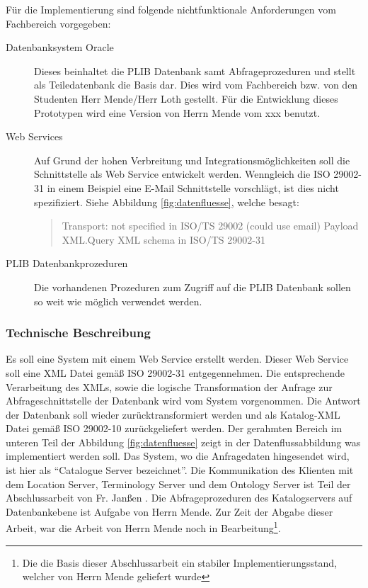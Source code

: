 Für die Implementierung sind folgende nichtfunktionale Anforderungen vom Fachbereich vorgegeben:
\begin{description}
\item[Datenbanksystem Oracle] Dieses beinhaltet die PLIB Datenbank samt Abfrageprozeduren und stellt als Teiledatenbank die Basis dar. Dies wird vom Fachbereich bzw. von den Studenten Herr Mende/Herr Loth gestellt. Für die Entwicklung dieses Prototypen wird eine Version von Herrn Mende vom xxx benutzt.  
\item[Web Services] Auf Grund der hohen Verbreitung und Integrationsmöglichkeiten soll die Schnittstelle als Web Service entwickelt werden. Wenngleich die ISO 29002-31 in einem Beispiel eine E-Mail Schnittstelle vorschlägt, ist dies nicht spezifiziert. Siehe Abbildung \ref{fig:datenfluesse}, welche besagt:
\begin{quotation}
Transport: not specified in ISO/TS 29002 (could use email) Payload XML.Query XML schema in ISO/TS 29002-31
\end{quotation}
\item[PLIB Datenbankprozeduren] Die vorhandenen Prozeduren zum Zugriff auf die PLIB Datenbank sollen so weit wie möglich verwendet werden. 
\end{description}

\subsubsection{Technische Beschreibung}
Es soll eine System mit einem Web Service erstellt werden. Dieser Web Service soll eine XML Datei gemäß ISO 29002-31 entgegennehmen. Die entsprechende Verarbeitung des XMLs, sowie die logische Transformation der Anfrage zur Abfrageschnittstelle der Datenbank wird vom System vorgenommen. Die Antwort der Datenbank soll wieder zurücktransformiert werden und als Katalog-XML Datei gemäß ISO 29002-10 zurückgeliefert werden. 
Der gerahmten Bereich im unteren Teil der Abbildung \ref{fig:datenfluesse} zeigt in der Datenflussabbildung was implementiert werden soll. Das System, wo die Anfragedaten hingesendet wird, ist hier als \enquote{Catalogue Server bezeichnet}. 
Die Kommunikation des Klienten mit dem Location Server, Terminology Server und dem Ontology Server ist Teil der Abschlussarbeit von Fr. Janßen \citep[Vergl.][]{janssen}. 
Die Abfrageprozeduren des Katalogservers auf Datenbankebene ist Aufgabe von Herrn Mende. Zur Zeit der Abgabe dieser Arbeit, war die Arbeit von Herrn Mende noch in Bearbeitung\footnote{Die die Basis dieser Abschlussarbeit ein stabiler Implementierungsstand, welcher von Herrn Mende geliefert wurde}. 

